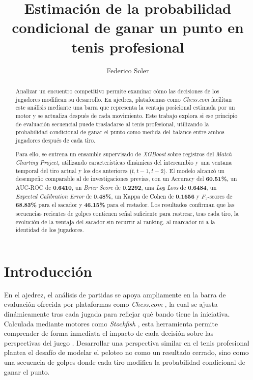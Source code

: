 \documentclass[journal]{IEEEtran}
\begin{document}
\title{Estimación de la probabilidad condicional de ganar un punto en tenis profesional}
\author{Federico Soler}
\maketitle

\begin{abstract}
Analizar un encuentro competitivo permite examinar cómo las decisiones de los jugadores modifican su desarrollo. En ajedrez, plataformas como \textit{Chess.com} facilitan este análisis mediante una barra que representa la ventaja posicional estimada por un motor y se actualiza después de cada movimiento. Este trabajo explora si ese principio de evaluación secuencial puede trasladarse al tenis profesional, utilizando la probabilidad condicional de ganar el punto como medida del balance entre ambos jugadores después de cada tiro.

Para ello, se entrena un ensamble supervisado de \textit{XGBoost} sobre registros del \textit{Match Charting Project}, utilizando características dinámicas del intercambio y una ventana temporal del tiro actual y los dos anteriores ($t,t-1,t-2$). El modelo alcanzó un desempeño comparable al de investigaciones previas, con un Accuracy del \textbf{60.51\%}, un AUC-ROC de \textbf{0.6410}, un \textit{Brier Score} de \textbf{0.2292}, una \textit{Log Loss} de \textbf{0.6484}, un \textit{Expected Calibration Error} de \textbf{0.48\%}, un Kappa de Cohen de \textbf{0.1656} y $F_1$-scores de \textbf{68.83\%} para el sacador y \textbf{46.15\%} para el restador. Los resultados confirman que las secuencias recientes de golpes contienen señal suficiente para rastrear, tras cada tiro, la evolución de la ventaja del sacador sin recurrir al ranking, al marcador ni a la identidad de los jugadores.
\end{abstract}

\section{Introducción}
En el ajedrez, el análisis de partidas se apoya ampliamente en la barra de evaluación ofrecida por plataformas como \textit{Chess.com} \cite{chesscom2026, chesscom_evaluation}, la cual se ajusta dinámicamente tras cada jugada para reflejar qué bando tiene la iniciativa. Calculada mediante motores como \textit{Stockfish} \cite{stockfish2026, stockfish_evaluation}, esta herramienta permite comprender de forma inmediata el impacto de cada decisión sobre las perspectivas del juego \cite{Regan2011IntrinsicChess}. Desarrollar una perspectiva similar en el tenis profesional plantea el desafío de modelar el peloteo no como un resultado cerrado, sino como una secuencia de golpes donde cada tiro modifica la probabilidad condicional de ganar el punto.
\end{document}
